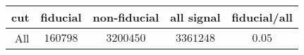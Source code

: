 \begin{tabular}{r|c|c|c|c}
cut&fiducial&non-fiducial&all signal&fiducial/all\\
\hline
All&$160798$&$3200450$&$3361248$&$0.05$\\
\end{tabular}
